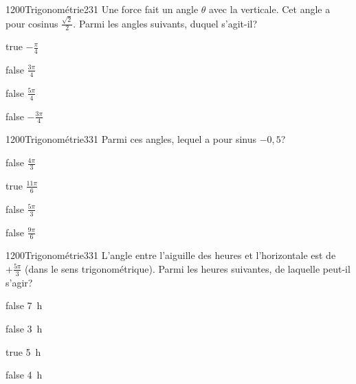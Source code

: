         	\begin{question}{1200}{Trigonométrie}{2}{31}
				Une force fait un angle $\theta$ avec la verticale. Cet angle a pour cosinus $\frac{\sqrt{2}}{2}$. Parmi les angles suivants, duquel s'agit-il?
            \end{question}
            \begin{reponses}
            	\item[true] $-\frac{\pi}{4}$
            	\item[false] $\frac{3\pi}{4}$
                \item[false] $\frac{5\pi}{4}$
                \item[false] $-\frac{3\pi}{4}$
            \end{reponses}
            \begin{question}{1200}{Trigonométrie}{3}{31}
                Parmi ces angles, lequel a pour sinus $-0,5$?
            \end{question}
            \begin{reponses}
                \item[false] $\frac{4\pi}{3}$
                \item[true] $\frac{11\pi}{6}$
                \item[false] $\frac{5\pi}{3}$
                \item[false] $\frac{9\pi}{6}$
            \end{reponses}
            \begin{question}{1200}{Trigonométrie}{3}{31}
                L'angle entre l'aiguille des heures et l'horizontale est de $+\frac{5\pi}{3}$ (dans le sens trigonométrique). Parmi les heures suivantes, de laquelle peut-il s'agir?
            \end{question}
            \begin{reponses}
                \item[false] \SI{7}{\hour}
                \item[false] \SI{3}{\hour}
                \item[true] \SI{5}{\hour} 
                \item[false] \SI{4}{\hour}
            \end{reponses}
